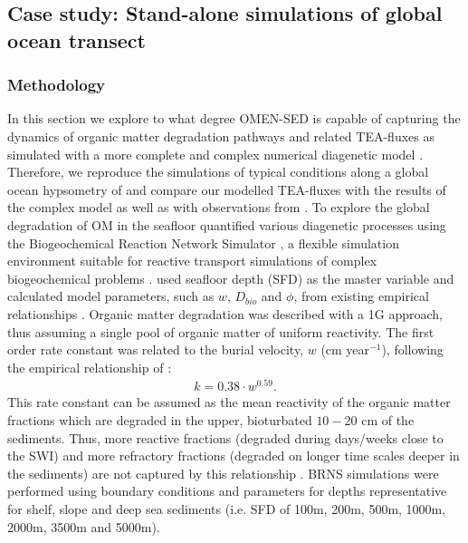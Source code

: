 \documentclass[gmd, manuscript]{copernicus}
\begin{document}
\subsection{Case study: Stand-alone simulations of global ocean transect}\label{subsec:globalhypsometry}
\subsubsection{Methodology}
In this section we explore to what degree OMEN-SED is capable of capturing the dynamics of organic matter degradation pathways and related TEA-fluxes as simulated with a more complete and complex numerical diagenetic model \citep{thullner_global_scale_2009}. 
Therefore, we reproduce the simulations of typical conditions along a global ocean hypsometry of \citet{thullner_global_scale_2009} and compare our modelled TEA-fluxes with the results of the complex model as well as with 
observations from \citet{middelburg_denitrification_1996}. To explore the global degradation of OM in the seafloor 
\citet{thullner_global_scale_2009} quantified various diagenetic processes using the Biogeochemical Reaction Network Simulator \citep[BRNS,][]{aguilera_knowledge-based_2005}, 
a flexible simulation environment suitable for reactive transport simulations of complex biogeochemical problems \citep[e.g.][]{jourabchi_quantitative_2005, thullner_modeling_2005}. 
\citet{thullner_global_scale_2009} used seafloor depth (SFD) as the master variable and calculated model parameters, such as $w$, $D_{bio}$ and $\phi$, from existing empirical relationships 
\citep[e.g.][]{van1995metal, middelburg_empirical_1997}. 
Organic matter degradation was described with a 1G approach, thus assuming a single pool of organic matter of uniform reactivity. 
The first order rate constant was related to the burial velocity, $w$ (cm year$^{-1}$), following the empirical relationship of \citet{boudreau1997diagenetic}:
\begin{align}
 k=0.38\cdot w^{0.59}.
\end{align}
This rate constant can be assumed as the mean reactivity of the organic matter fractions which are degraded in the upper, bioturbated $10-20$ cm of the sediments. 
Thus, more reactive fractions (degraded during days/weeks close to the SWI) and more refractory fractions (degraded on longer time scales deeper in the sediments) are not captured by this relationship \citep{boudreau1997diagenetic}. 
BRNS simulations were performed using boundary conditions and parameters for depths representative for shelf, slope and deep sea sediments (i.e. SFD of 100m, 200m, 500m, 1000m, 2000m, 3500m and 5000m). 
\end{document}
